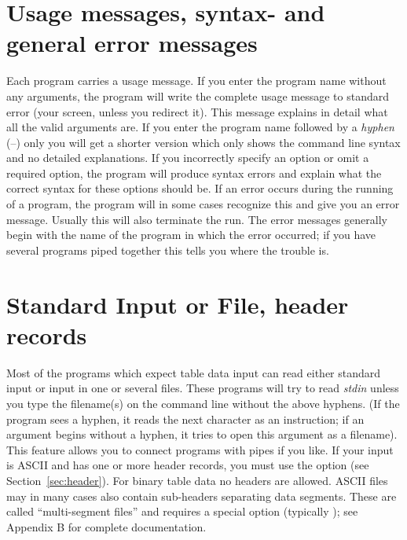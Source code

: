 \section{Usage messages, syntax- and general error messages}

Each program carries a usage message.  If you enter the program
name without any arguments, the program will write the complete
usage message to standard error (your screen, unless you
redirect it).  This message explains in detail what all the
valid arguments are.  If you enter the program name followed
by a \emph{hyphen} (--) only you will get a shorter version
which only shows the command line syntax and no detailed
explanations.  If you incorrectly specify an option or omit
a required option, the program will produce syntax errors and
explain what the correct syntax for these options should be.
If an error occurs during the running of a program, the
program will in some cases recognize this and give you an
error message.  Usually this will also terminate the run.
The error messages generally begin with the name of the
program in which the error occurred; if you have several
programs piped together this tells you where the trouble is. 

\section{Standard Input or File, header records}

Most of the programs which expect table data input can read
either standard input or input in one or several files.
These programs will try to read {\it stdin} unless you type
the filename(s) on the command line without the above hyphens.
(If the program sees a hyphen, it reads the next character
as an instruction; if an argument begins without a hyphen,
it tries to open this argument as a filename).
This feature allows you to connect programs with pipes if
you like.  If your input is ASCII and has one or more header
records, you must use the  option (see Section~\ref{sec:header}).
For binary table data no headers are allowed.
ASCII files may in many cases also contain sub-headers
separating data segments.  These are called ``multi-segment files''
and requires a special option (typically ); see Appendix B for complete
documentation. 

